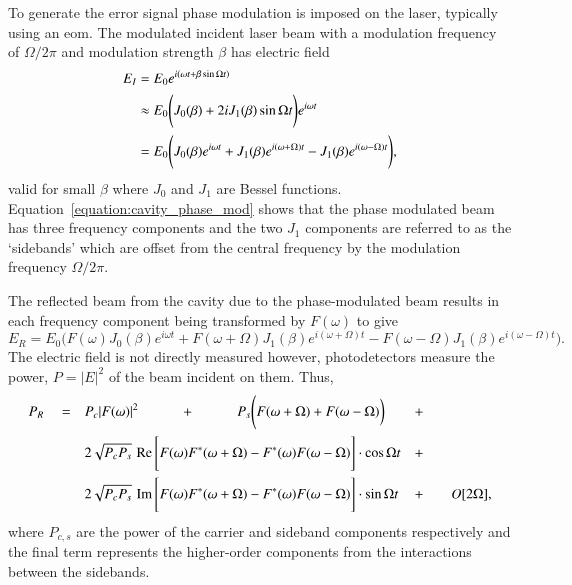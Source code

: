 To generate the error signal phase modulation is imposed on the laser, typically using an \gls{eom}.
The modulated incident laser beam with a modulation frequency of $\Omega/2\pi$ and modulation strength $\beta$ has electric field
\begin{align}
E_I &= E_0 e^{i\left(\omega t + \beta \sin\Omega t \right)} \notag \\
&\approx E_0 \Bigg( J_0(\beta) + 2iJ_1(\beta)\sin\Omega t \Bigg)e^{i\omega t} \notag \\
&= E_0 \Bigg( J_0(\beta)e^{i\omega t} + J_1(\beta)e^{i(\omega + \Omega)t} - J_1(\beta)e^{i(\omega - \Omega)t} \Bigg),\label{equation:cavity_phase_mod}
\end{align}
valid for small $\beta$ where $J_0$ and $J_1$ are Bessel functions.
Equation~\ref{equation:cavity_phase_mod} shows that the phase modulated beam has three frequency components and the two $J_1$ components are referred to as the `sidebands' which are offset from the central frequency by the modulation frequency $\Omega/2\pi$.

The reflected beam from the cavity due to the phase-modulated beam results in each frequency component being transformed by $F(\omega)$ to give
\begin{equation}
E_R = E_0 \Bigg(F(\omega)J_0(\beta)e^{i\omega t} + F(\omega+\Omega)J_1(\beta)e^{i(\omega+\Omega) t} - F(\omega-\Omega)J_1(\beta)e^{i(\omega-\Omega) t} \Bigg).
\end{equation}
The electric field is not directly measured however, photodetectors measure the power, $P=|E|^2$ of the beam incident on them.
Thus,
\begin{align}
P_R \quad= \quad&P_c|F(\omega)|^2 \quad\qquad+\quad\qquad P_s \Bigg( F(\omega+\Omega) + F(\omega-\Omega)\bigg) &+\qquad&\notag\\
& 2\sqrt{P_cP_s} \, \operatorname{Re}\Bigg[ F(\omega)F^*(\omega+\Omega)-F^*(\omega)F(\omega-\Omega)\Bigg]\cdot\cos\Omega t &+\qquad& \notag\\
& 2\sqrt{P_cP_s} \, \operatorname{Im}\Bigg[ F(\omega)F^*(\omega+\Omega)-F^*(\omega)F(\omega-\Omega)\Bigg]\cdot\sin\Omega t &+ \qquad&O[2\Omega],
\end{align}
where $P_{c,s}$ are the power of the carrier and sideband components respectively and the final term represents the higher-order components from the interactions between the sidebands.

